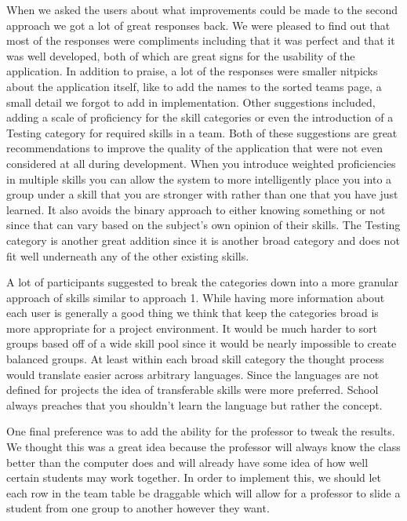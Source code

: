 \documentclass[conference]{IEEEtran}
\begin{document}
When we asked the users about what improvements could be made to the second approach we got a lot of great responses back. We were pleased to find out that most of the responses were compliments including that it was perfect and that it was well developed, both of which are great signs for the usability of the application. In addition to praise, a lot of the responses were smaller nitpicks about the application itself, like to add the names to the sorted teams page, a small detail we forgot to add in implementation. Other suggestions included, adding a scale of proficiency for the skill categories or even the introduction of a Testing category for required skills in a team. Both of these suggestions are great recommendations to improve the quality of the application that were not even considered at all during development. When you introduce weighted proficiencies in multiple skills you can allow the system to more intelligently place you into a group under a skill that you are stronger with rather than one that you have just learned. It also avoids the binary approach to either knowing something or not since that can vary based on the subject's own opinion of their skills. The Testing category is another great addition since it is another broad category and does not fit well underneath any of the other existing skills. 

A lot of participants suggested to break the categories down into a more granular approach of skills similar to approach 1. While having more information about each user is generally a good thing we think that keep the categories broad is more appropriate for a project environment. It would be much harder to sort groups based off of a wide skill pool since it would be nearly impossible to create balanced groups. At least within each broad skill category the thought process would translate easier across arbitrary languages. Since the languages are not defined for projects the idea of transferable skills were more preferred. School always preaches that you shouldn't learn the language but rather the concept. 

One final preference was to add the ability for the professor to tweak the results. We thought this was a great idea because the professor will always know the class better than the computer does and will already have some idea of how well certain students may work together. In order to implement this, we should let each row in the team table be draggable which will allow for a professor to slide a student from one group to another however they want. 
\end{document}
